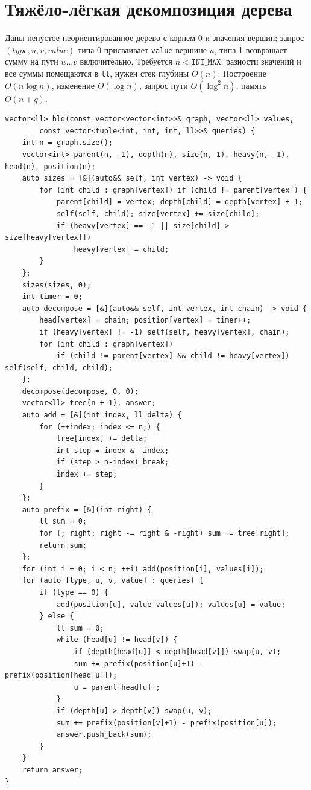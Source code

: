 \section{Тяжёло-лёгкая декомпозиция дерева}
Даны непустое неориентированное дерево с корнем 0 и значения вершин; запрос $(type,u,v,value)$ типа 0 присваивает \texttt{value} вершине $u$, типа 1 возвращает сумму на пути $u\ldots v$ включительно.
Требуется $n<\texttt{INT\_MAX}$; разности значений и все суммы помещаются в \texttt{ll}, нужен стек глубины $O(n)$.
Построение $O(n\log n)$, изменение $O(\log n)$, запрос пути $O(\log^2 n)$, память $O(n+q)$.
\begin{lstlisting}[name=hld]
vector<ll> hld(const vector<vector<int>>& graph, vector<ll> values,
        const vector<tuple<int, int, int, ll>>& queries) {
    int n = graph.size();
    vector<int> parent(n, -1), depth(n), size(n, 1), heavy(n, -1), head(n), position(n);
    auto sizes = [&](auto&& self, int vertex) -> void {
        for (int child : graph[vertex]) if (child != parent[vertex]) {
            parent[child] = vertex; depth[child] = depth[vertex] + 1;
            self(self, child); size[vertex] += size[child];
            if (heavy[vertex] == -1 || size[child] > size[heavy[vertex]])
                heavy[vertex] = child;
        }
    };
    sizes(sizes, 0);
    int timer = 0;
    auto decompose = [&](auto&& self, int vertex, int chain) -> void {
        head[vertex] = chain; position[vertex] = timer++;
        if (heavy[vertex] != -1) self(self, heavy[vertex], chain);
        for (int child : graph[vertex])
            if (child != parent[vertex] && child != heavy[vertex]) self(self, child, child);
    };
    decompose(decompose, 0, 0);
    vector<ll> tree(n + 1), answer;
    auto add = [&](int index, ll delta) {
        for (++index; index <= n;) {
            tree[index] += delta;
            int step = index & -index;
            if (step > n-index) break;
            index += step;
        }
    };
    auto prefix = [&](int right) {
        ll sum = 0;
        for (; right; right -= right & -right) sum += tree[right];
        return sum;
    };
    for (int i = 0; i < n; ++i) add(position[i], values[i]);
    for (auto [type, u, v, value] : queries) {
        if (type == 0) {
            add(position[u], value-values[u]); values[u] = value;
        } else {
            ll sum = 0;
            while (head[u] != head[v]) {
                if (depth[head[u]] < depth[head[v]]) swap(u, v);
                sum += prefix(position[u]+1) - prefix(position[head[u]]);
                u = parent[head[u]];
            }
            if (depth[u] > depth[v]) swap(u, v);
            sum += prefix(position[v]+1) - prefix(position[u]);
            answer.push_back(sum);
        }
    }
    return answer;
}
\end{lstlisting}

